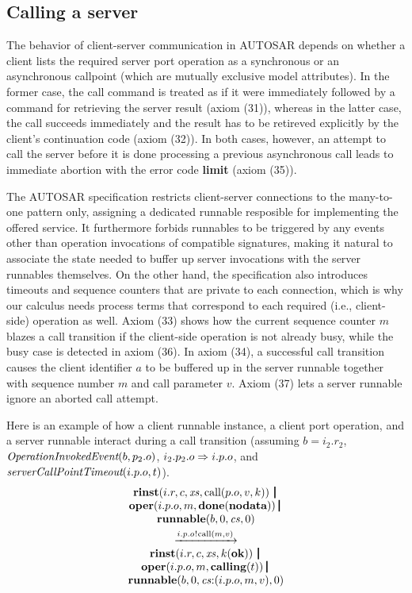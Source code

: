 \documentclass[twocolumn]{article}
\begin{document}
\subsection{Calling a server}

The behavior of client-server communication in AUTOSAR depends on whether a client lists the required server port operation as a synchronous or an asynchronous callpoint (which are mutually exclusive model attributes). In the former case, the call command is treated as if it were immediately followed by a command for retrieving the server result (axiom (31)), whereas in the latter case, the call succeeds immediately and the result has to be retireved explicitly by the client's continuation code (axiom (32)). In both cases, however, an attempt to call the server before it is done processing a previous asynchronous call leads to immediate abortion with the error code {\bf limit} (axiom (35)). 

The AUTOSAR specification restricts client-server connections to the many-to-one pattern only, assigning a dedicated runnable resposible for implementing the offered service. It furthermore forbids runnables to be triggered by any events other than operation invocations of compatible signatures, making it natural to associate the state needed to buffer up server invocations with the server runnables themselves. On the other hand, the specification also introduces timeouts and sequence counters that are private to each connection, which is why our calculus needs process terms that correspond to each required (i.e., client-side) operation as well. Axiom (33) shows how the current sequence counter $m$ blazes a call transition if the client-side operation is not already busy, while the busy case is detected in axiom (36). In axiom (34), a successful call transition causes the client identifier $a$ to be buffered up in the server runnable together with sequence number $m$ and call parameter $v$. Axiom (37) lets a server runnable ignore an aborted call attempt.

Here is an example of how a client runnable instance, a client port operation, and a server runnable interact during a call transition (assuming $b = {i_2.r_2}$, $\emph{OperationInvokedEvent}(b,p_2.o)$, $i_2.p_2.o \Rightarrow i.p.o$, and $\emph{serverCallPointTimeout}(i.p.o,t) $).
$$
\begin{array}{c}
	{\Trinst {i.r} c \Xs {\TrteCall {p.o} v k}} \,\Opar  \\
	{\Toper {i.p.o} m {\Tdone \Tnodata}} \Opar \\
	{\Trunnable b 0 \Cs 0} \vspace{0.6ex} \\
	\red{\say{i.p.o}{\Tcall m v}} \\
	{\Trinst {i.r} c \Xs {\Tap k \Tok}} \,\Opar \\
	{\Toper {i.p.o} m {\Tcalling t}} \Opar \\
	{\Trunnable b 0 {\Tcons \Cs {\Tclient {i.p.o} m v}}  0} 
\end{array}
$$
\end{document}
